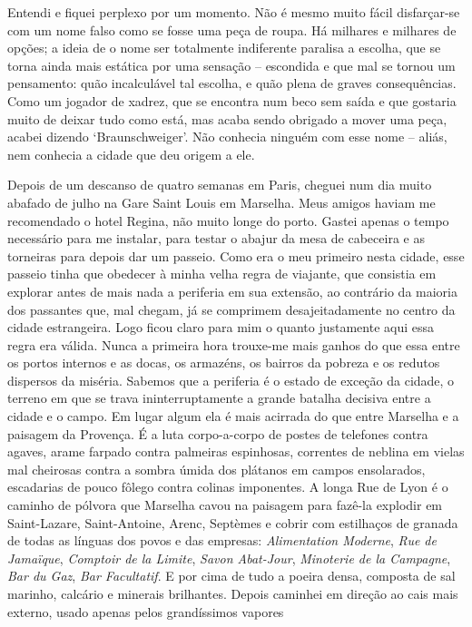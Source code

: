 Entendi e fiquei perplexo por um momento. Não é mesmo muito fácil
disfarçar-se com um nome falso como se fosse uma peça de roupa. Há
milhares e milhares de opções; a ideia de o nome ser totalmente
indiferente paralisa a escolha, que se torna ainda mais estática por uma
sensação -- escondida e que mal se tornou um pensamento: quão
incalculável tal escolha, e quão plena de graves consequências. Como um
jogador de xadrez, que se encontra num beco sem saída e que gostaria
muito de deixar tudo como está, mas acaba sendo obrigado a mover uma
peça, acabei dizendo `Braunschweiger'. Não conhecia ninguém com esse
nome -- aliás, nem conhecia a cidade que deu origem a ele.

Depois de um descanso de quatro semanas em Paris, cheguei num dia muito
abafado de julho na Gare Saint Louis em Marselha. Meus amigos haviam me
recomendado o hotel Regina, não muito longe do porto. Gastei apenas o
tempo necessário para me instalar, para testar o abajur da mesa de
cabeceira e as torneiras para depois dar um passeio. Como era o meu
primeiro nesta cidade, esse passeio tinha que obedecer à minha velha
regra de viajante, que consistia em explorar antes de mais nada a
periferia em sua extensão, ao contrário da maioria dos passantes que,
mal chegam, já se comprimem desajeitadamente no centro da cidade
estrangeira. Logo ficou claro para mim o quanto justamente aqui essa
regra era válida. Nunca a primeira hora trouxe-me mais ganhos do que
essa entre os portos internos e as docas, os armazéns, os bairros da
pobreza e os redutos dispersos da miséria. Sabemos que a periferia é o
estado de exceção da cidade, o terreno em que se trava ininterruptamente
a grande batalha decisiva entre a cidade e o campo. Em lugar algum ela é
mais acirrada do que entre Marselha e a paisagem da Provença. É a luta
corpo-a-corpo de postes de telefones contra agaves, arame farpado contra
palmeiras espinhosas, correntes de neblina em vielas mal cheirosas
contra a sombra úmida dos plátanos em campos ensolarados, escadarias de
pouco fôlego contra colinas imponentes. A longa Rue de Lyon é o caminho
de pólvora que Marselha cavou na paisagem para fazê-la explodir em
Saint-Lazare, Saint-Antoine, Arenc, Septèmes e cobrir com estilhaços de
granada de todas as línguas dos povos e das empresas: \emph{Alimentation
Moderne}, \emph{Rue de Jamaïque}, \emph{Comptoir de la Limite},
\emph{Savon Abat-Jour}, \emph{Minoterie de la Campagne}, \emph{Bar du
Gaz}, \emph{Bar Facultatif}. E por cima de tudo a poeira densa, composta
de sal marinho, calcário e minerais brilhantes. Depois caminhei em
direção ao cais mais externo, usado apenas pelos grandíssimos vapores
